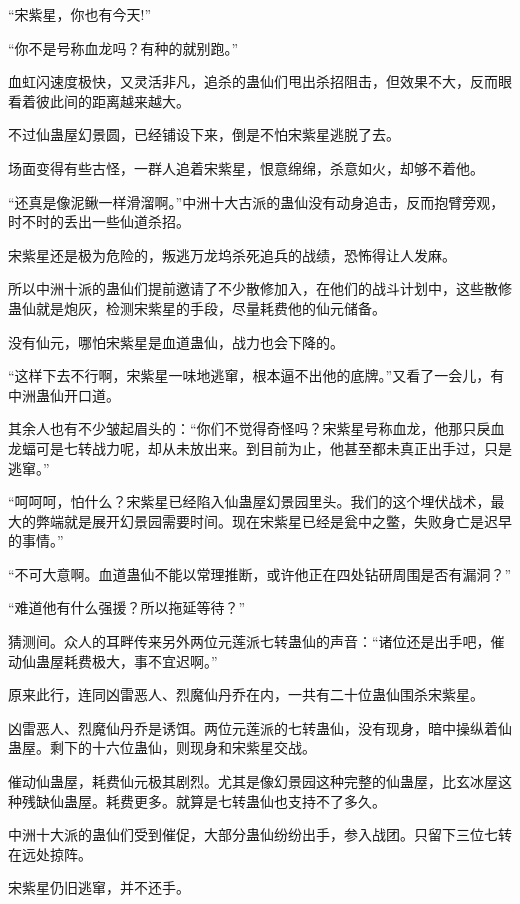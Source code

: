 
\begin{this_body}

“宋紫星，你也有今天!”

“你不是号称血龙吗？有种的就别跑。”

血虹闪速度极快，又灵活非凡，追杀的蛊仙们甩出杀招阻击，但效果不大，反而眼看着彼此间的距离越来越大。

不过仙蛊屋幻景圆，已经铺设下来，倒是不怕宋紫星逃脱了去。

场面变得有些古怪，一群人追着宋紫星，恨意绵绵，杀意如火，却够不着他。

“还真是像泥鳅一样滑溜啊。”中洲十大古派的蛊仙没有动身追击，反而抱臂旁观，时不时的丢出一些仙道杀招。

宋紫星还是极为危险的，叛逃万龙坞杀死追兵的战绩，恐怖得让人发麻。

所以中洲十派的蛊仙们提前邀请了不少散修加入，在他们的战斗计划中，这些散修蛊仙就是炮灰，检测宋紫星的手段，尽量耗费他的仙元储备。

没有仙元，哪怕宋紫星是血道蛊仙，战力也会下降的。

“这样下去不行啊，宋紫星一味地逃窜，根本逼不出他的底牌。”又看了一会儿，有中洲蛊仙开口道。

其余人也有不少皱起眉头的：“你们不觉得奇怪吗？宋紫星号称血龙，他那只戾血龙蝠可是七转战力呢，却从未放出来。到目前为止，他甚至都未真正出手过，只是逃窜。”

“呵呵呵，怕什么？宋紫星已经陷入仙蛊屋幻景园里头。我们的这个埋伏战术，最大的弊端就是展开幻景园需要时间。现在宋紫星已经是瓮中之鳖，失败身亡是迟早的事情。”

“不可大意啊。血道蛊仙不能以常理推断，或许他正在四处钻研周围是否有漏洞？”

“难道他有什么强援？所以拖延等待？”

猜测间。众人的耳畔传来另外两位元莲派七转蛊仙的声音：“诸位还是出手吧，催动仙蛊屋耗费极大，事不宜迟啊。”

原来此行，连同凶雷恶人、烈魔仙丹乔在内，一共有二十位蛊仙围杀宋紫星。

凶雷恶人、烈魔仙丹乔是诱饵。两位元莲派的七转蛊仙，没有现身，暗中操纵着仙蛊屋。剩下的十六位蛊仙，则现身和宋紫星交战。

催动仙蛊屋，耗费仙元极其剧烈。尤其是像幻景园这种完整的仙蛊屋，比玄冰屋这种残缺仙蛊屋。耗费更多。就算是七转蛊仙也支持不了多久。

中洲十大派的蛊仙们受到催促，大部分蛊仙纷纷出手，参入战团。只留下三位七转在远处掠阵。

宋紫星仍旧逃窜，并不还手。


\end{this_body}
